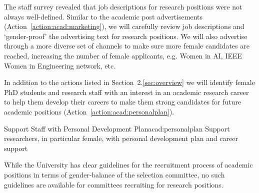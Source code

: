 

The staff survey revealed that job descriptions for research positions were not always well-defined. Similar to the academic post advertisements (Action~\ref{action:acad:marketing}), we will carefully review job descriptions and `gender-proof' the advertising text for research positions.
We will also advertise through a more diverse set of channels to make sure more female candidates are reached, increasing the number of female applicants, e.g. Women in AI, IEEE Women in Engineering network, etc.

In addition to the actions listed in Section~2.\ref{sec:overview} 
we will identify female PhD students and research staff with an interest in an academic research career to help them develop their careers to make them strong candidates for future academic positions (Action~\ref{action:acad:personalplan}).








\newcommand{\actacadpersonalplan}{%
Support researchers, in particular female, with personal development plan and career support}
\begin{actionblock}{\ksspace{}Support Staff with Personal Development Plan}{acad:personalplan}
\actacadpersonalplan
\hfill{
    \hypersetup{hidelinks}
    \hyperlink{c4}{\gotoactionsymbol{}}
}
\end{actionblock}

While the University has clear guidelines for the recruitment process of academic positions in terms of gender-balance of the selection committee, %
no such guidelines are available for committees recruiting for research positions. 

